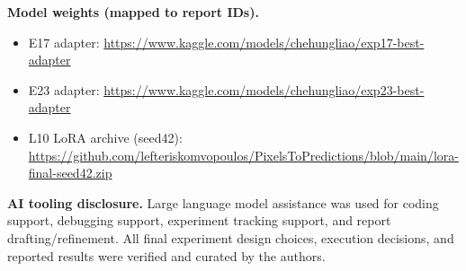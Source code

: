 \documentclass[11pt]{article}
\begin{document}
\noindent\textbf{Model weights (mapped to report IDs).}
\begin{itemize}
  \item E17 adapter: \url{https://www.kaggle.com/models/chehungliao/exp17-best-adapter}
  \item E23 adapter: \url{https://www.kaggle.com/models/chehungliao/exp23-best-adapter}
  \item L10 LoRA archive (seed42): \url{https://github.com/lefteriskomvopoulos/PixelsToPredictions/blob/main/lora-final-seed42.zip}
\end{itemize}

\noindent\textbf{AI tooling disclosure.}
Large language model assistance was used for coding support, debugging support, experiment tracking support, and report drafting/refinement. All final experiment design choices, execution decisions, and reported results were verified and curated by the authors.
\end{document}
